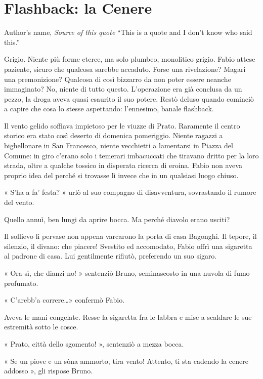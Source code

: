 \chapter{Flashback: la Cenere}

\begin{chapquote}{Author's name, \textit{Source of this quote}}
``This is a quote and I don't know who said this.''
\end{chapquote}


Grigio. Niente più forme eteree, ma solo plumbeo, monolitico grigio. Fabio attese paziente, sicuro che qualcosa sarebbe accaduto. Forse una rivelazione? Magari una premonizione? Qualcosa di così bizzarro da non poter essere neanche immaginato? No, niente di tutto questo. L'operazione era già conclusa da un pezzo, la droga aveva quasi esaurito il suo potere. Restò deluso quando cominciò a capire che cosa lo stesse aspettando: l'ennesimo, banale flashback.

Il vento gelido soffiava impietoso per le viuzze di Prato. Raramente il centro storico era stato così deserto di domenica pomeriggio. Niente ragazzi a bighellonare in San Francesco, niente vecchietti a lamentarsi in Piazza del Comune: in giro c'erano solo i temerari imbacuccati che tiravano dritto per la loro strada, oltre a qualche tossico in disperata ricerca di eroina. Fabio non aveva proprio idea del perché si trovasse lì invece che in un qualsiasi luogo chiuso.

« S'ha a fa' festa? » urlò al suo compagno di disavventura, sovrastando il rumore del vento.

Quello annuì, ben lungi da aprire bocca. Ma perché diavolo erano usciti?

Il sollievo li pervase non appena varcarono la porta di casa Bagonghi. Il tepore, il silenzio, il divano: che piacere! Svestito ed accomodato, Fabio offrì una sigaretta al padrone di casa. Lui gentilmente rifiutò, preferendo un suo sigaro.

« Ora sì, che dianzi no! » sentenziò Bruno, seminascosto in una nuvola di fumo profumato.

« C'arebb'a correre\ldots» confermò Fabio.

Aveva le mani congelate. Resse la sigaretta fra le labbra e mise a scaldare le sue estremità sotto le cosce.

« Prato, città dello sgomento! », sentenziò a mezza bocca.

« Se \textsc{}un piove e \textsc{}un sòna ammorto, tira vento! Attento, ti sta cadendo la cenere addosso », gli rispose Bruno.

